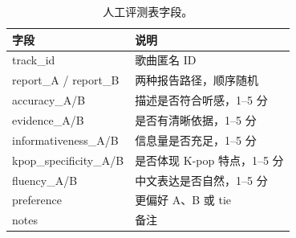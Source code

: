 \documentclass[UTF8,zihao=-4]{ctexart}
\begin{document}
\begin{table}[H]
\centering
\caption{人工评测表字段。}
\begin{tabular}{ll}
\toprule
字段 & 说明 \\
\midrule
track\_id & 歌曲匿名 ID \\
report\_A / report\_B & 两种报告路径，顺序随机 \\
accuracy\_A/B & 描述是否符合听感，1--5 分 \\
evidence\_A/B & 是否有清晰依据，1--5 分 \\
informativeness\_A/B & 信息量是否充足，1--5 分 \\
kpop\_specificity\_A/B & 是否体现 K-pop 特点，1--5 分 \\
fluency\_A/B & 中文表达是否自然，1--5 分 \\
preference & 更偏好 A、B 或 tie \\
notes & 备注 \\
\bottomrule
\end{tabular}
\end{table}
\end{document}
